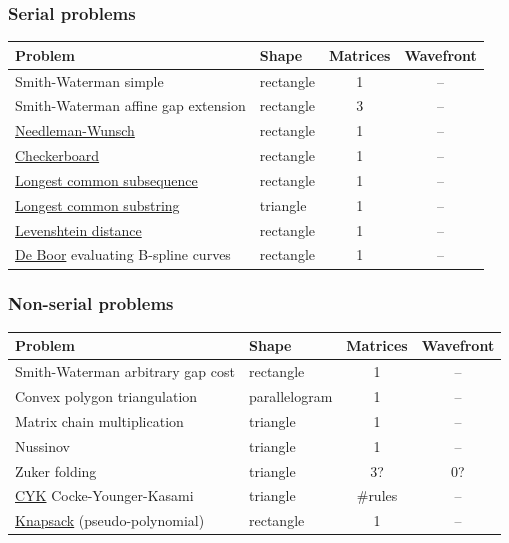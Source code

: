 \subsubsection{Serial problems}
\begin{tabular}{llcc} \toprule
\bf Problem & \bf Shape & \bf Matrices & \bf Wavefront \\ \midrule
Smith-Waterman \footnotesize simple & rectangle & 1 & -- \\
Smith-Waterman \footnotesize affine gap extension & rectangle & 3 & -- \\
\href{http://en.wikipedia.org/wiki/Needleman-Wunsch_algorithm}{Needleman-Wunsch} & rectangle & 1 & -- \\

\href{http://en.wikipedia.org/wiki/Dynamic_programming#Checkerboard}{Checkerboard} & rectangle & 1 & -- \\
\href{http://en.wikipedia.org/wiki/Longest_common_subsequence_problem\#Code_for_the_dynamic_programming_solution}{Longest common subsequence} & rectangle & 1 & -- \\
\href{http://en.wikipedia.org/wiki/Longest_common_substring_problem\#Pseudocode}{Longest common substring} & triangle & 1 & -- \\
\href{http://en.wikipedia.org/wiki/Levenshtein_distance\#Computing_Levenshtein_distance}{Levenshtein distance} & rectangle & 1 & -- \\
\href{http://en.wikipedia.org/wiki/De_Boor's_algorithm}{De Boor} \footnotesize evaluating B-spline curves & rectangle & 1 & -- \\
\end{tabular}

\subsubsection{Non-serial problems}
\begin{tabular}{llcc} \toprule
\bf Problem & \bf Shape & \bf Matrices & \bf Wavefront \\ \midrule
Smith-Waterman \footnotesize arbitrary gap cost & rectangle & 1 & -- \\
Convex polygon triangulation & parallelogram & 1 & -- \\
Matrix chain multiplication & triangle & 1 & -- \\
Nussinov & triangle & 1 & -- \\
Zuker folding & triangle & \color{red} 3? & \color{red} 0? \\
\href{http://en.wikipedia.org/wiki/CYK_algorithm}{CYK} \footnotesize Cocke-Younger-Kasami & triangle & \#rules & -- \\
\href{http://en.wikipedia.org/wiki/Knapsack_problem#Dynamic_programming}{Knapsack} \footnotesize (pseudo-polynomial) & rectangle & 1 & --\\
\end{tabular}

